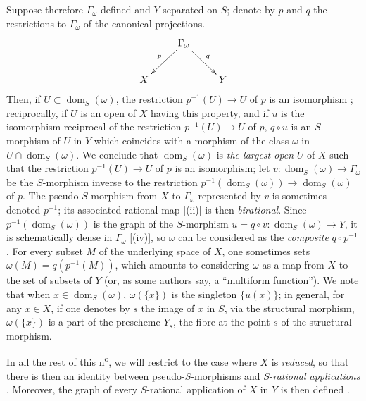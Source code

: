 \begin{env}[20.4.2]
\label{IV.20.4.2}
Suppose therefore $\Gamma_\omega$ defined and $Y$ separated on $S$;
denote by $p$ and $q$ the restrictions to $\Gamma_\omega$ of the canonical projections.
\[
  \xymatrix{
  & \Gamma_\omega \ar[dl]_p \ar[dr]^q & \\
  X & & Y
  }
\]
Then, if $U\subset\operatorname{dom}_S(\omega)$, the restriction $p^{-1}(U)\to U$ of $p$ is an isomorphism ;
reciprocally, if $U$ is an open of $X$ having this property, and if $u$ is the isomorphism reciprocal of the restriction $p^{-1}(U)\to U$ of $p$, $q\circ u$ is an $S$-morphism of $U$ in $Y$ which coincides with a morphism of the class $\omega$ in $U\cap\operatorname{dom}_S(\omega)$.
We conclude that $\operatorname{dom}_S(\omega)$ is \emph{the largest open} $U$ of $X$ such that the restriction $p^{-1}(U)\to U$ of $p$ is an
isomorphism;
let $v:\operatorname{dom}_S(\omega)\to\Gamma_\omega$ be the $S$-morphism inverse to the restriction $p^{-1}(\operatorname{dom}_S(\omega))\to\operatorname{dom}_S(\omega)$ of $p$.
The pseudo-$S$-morphism from $X$ to $\Gamma_\omega$ represented by $v$ is sometimes denoted $p^{-1}$; its associated rational map [(ii)] is then \emph{birational}.
Since $p^{-1}(\operatorname{dom}_S(\omega))$ is the graph of the $S$-morphism $u=q\circ v:\operatorname{dom}_S(\omega)\to Y$, it is schematically dense in $\Gamma_\omega$ [(iv)], so $\omega$ can be considered as the \emph{composite} $q\circ p^{-1}$ .
For every subset $M$ of the underlying space of $X$, one sometimes sets $\omega(M)=q(p^{-1}(M))$, which amounts to considering $\omega$ as a map from $X$ to the set of subsets of $Y$ (or, as some authors say, a ``multiform function'').
We note that when $x\in\operatorname{dom}_S(\omega)$, $\omega(\{x\})$ is the singleton $\{u(x)\}$;
in general, for any $x\in X$, if one denotes by $s$ the image of $x$ in $S$, via the structural morphism, $\omega(\{x\})$ is a part of the prescheme $Y_s$, the fibre at the point $s$ of the structural morphism.
\end{env}

\begin{env}[20.4.3]
\label{IV.20.4.3}
In all the rest of this n\textsuperscript{o}, we will restrict to the case where $X$ is \emph{reduced}, so that there is then an identity between pseudo-$S$-morphisms and $S$-\emph{rational applications} .
Moreover, the graph of every $S$-rational application of $X$ in $Y$ is then defined .
\end{env}

